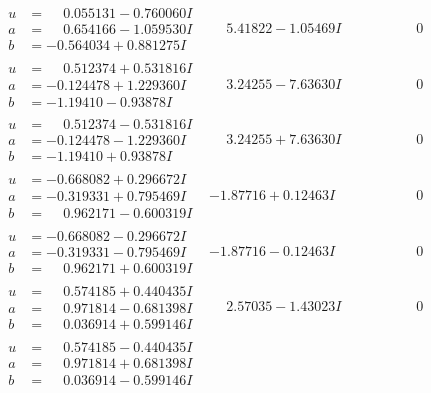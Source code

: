 \documentclass[1p]{elsarticle_modified}
\theoremstyle{definition}
\begin{document}
$$\begin{array}{c|c|c}
\begin{aligned}
u &= \phantom{-}0.055131 - 0.760060 I \\
a &= \phantom{-}0.654166 - 1.059530 I \\
b &= -0.564034 + 0.881275 I\end{aligned}
 & \phantom{-}5.41822 - 1.05469 I & \phantom{-0.000000 } 0 \\ \hline\begin{aligned}
u &= \phantom{-}0.512374 + 0.531816 I \\
a &= -0.124478 + 1.229360 I \\
b &= -1.19410 - 0.93878 I\end{aligned}
 & \phantom{-}3.24255 - 7.63630 I & \phantom{-0.000000 } 0 \\ \hline\begin{aligned}
u &= \phantom{-}0.512374 - 0.531816 I \\
a &= -0.124478 - 1.229360 I \\
b &= -1.19410 + 0.93878 I\end{aligned}
 & \phantom{-}3.24255 + 7.63630 I & \phantom{-0.000000 } 0 \\ \hline\begin{aligned}
u &= -0.668082 + 0.296672 I \\
a &= -0.319331 + 0.795469 I \\
b &= \phantom{-}0.962171 - 0.600319 I\end{aligned}
 & -1.87716 + 0.12463 I & \phantom{-0.000000 } 0 \\ \hline\begin{aligned}
u &= -0.668082 - 0.296672 I \\
a &= -0.319331 - 0.795469 I \\
b &= \phantom{-}0.962171 + 0.600319 I\end{aligned}
 & -1.87716 - 0.12463 I & \phantom{-0.000000 } 0 \\ \hline\begin{aligned}
u &= \phantom{-}0.574185 + 0.440435 I \\
a &= \phantom{-}0.971814 - 0.681398 I \\
b &= \phantom{-}0.036914 + 0.599146 I\end{aligned}
 & \phantom{-}2.57035 - 1.43023 I & \phantom{-0.000000 } 0 \\ \hline\begin{aligned}
u &= \phantom{-}0.574185 - 0.440435 I \\
a &= \phantom{-}0.971814 + 0.681398 I \\
b &= \phantom{-}0.036914 - 0.599146 I\end{aligned}

\end{array}$$
\end{document}
